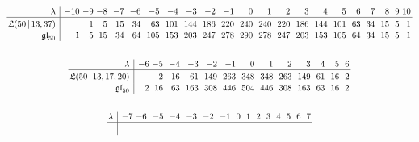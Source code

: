 \documentclass{amsart}
\def\gl{\mathfrak{gl}}
\def\L{\mathfrak L}
\theoremstyle{definition}
\begin{document}
\begin{table}[!hbt]
\small
\begin{gather*}
\begin{array}{@{\,}r|r@{\ }r@{\ }r@{\ \ }r@{\ \ }r@{\ \ }r@{\ \ }r@{\ \ }r@{\ \ }r@{\ \ }r@{\ \ }r@{\ \ }r@{\ \ }r@{\ \ }r@{\ \ }r@{\ \ }r@{\ \ }r@{\ \ }r@{\ \ }r@{\ \ }r@{\ }r@{\,}}
\lambda & -10 &  -9 & -8 & -7 & -6 & -5 & -4 & -3 & -2 & -1 & 0 & 1 & 2 & 3 & 4 & 5 & 6 & 7 & 8 & 9 & 10 \\
\hline
\rule[1.5ex]{0pt}{1ex}
\L(50 {\,|\,} 13,37) & & 1 & 5 & 15 & 34 & 63 & 101 & 144 & 186 & 220 & 240 & 240 & 220 & 186 & 144 & 101 & 63 & 34 & 15 & 5 & 1 
 \\[.25ex]
\gl_{50} &  1 & 5 & 15 & 34 & 64 & 105 & 153 & 203 & 247 & 278 & 290 & 278 & 247 & 203 & 153 & 105 & 64 & 34 & 15 & 5 & 1
\end{array}
%
\\[4ex]
%
\begin{array}{@{\,}r|r@{\ }r@{\ \ }r@{\ \ }r@{\ \ }r@{\ \ }r@{\ \ }r@{\ \ }r@{\ \ }r@{\ \ }r@{\ \ }r@{\ \ }r@{\ \ }r@{\,}}
\lambda & -6 &  -5 & -4 & -3 & -2 & -1 & 0 & 1 & 2 & 3 & 4 & 5 & 6 \\
\hline
\rule[1.5ex]{0pt}{1ex}
\L(50 {\,|\,} 13,17, 20) & & 2 & 16 & 61 & 149 & 263 & 348 & 348 & 263 & 149 & 61 & 16 & 2 
\\[.25ex]
\gl_{50} &  2 & 16 & 63 & 163 & 308 & 446 & 504 & 446 & 308 & 163 & 63 & 16 & 2 
\end{array}
%
\\[4ex]
%
\begin{array}{@{\,}r|r@{\ }r@{\ \ }r@{\ \ }r@{\ \ }r@{\ \ }r@{\ \ }r@{\ \ }r@{\ \ }r@{\ \ }r@{\ \ }r@{\ \ }r@{\ \ }r@{\ \ }r@{\ \ }r@{\,}}
\lambda & -7 & -6 & -5 & -4 & -3 & -2 & -1 & 0 & 1 & 2 & 3 & 4 & 5 & 6 & 7 \\
\hline
\rule[1.5ex]{0pt}{1ex}

\end{array}
\end{gather*}
\end{table}
\end{document}
